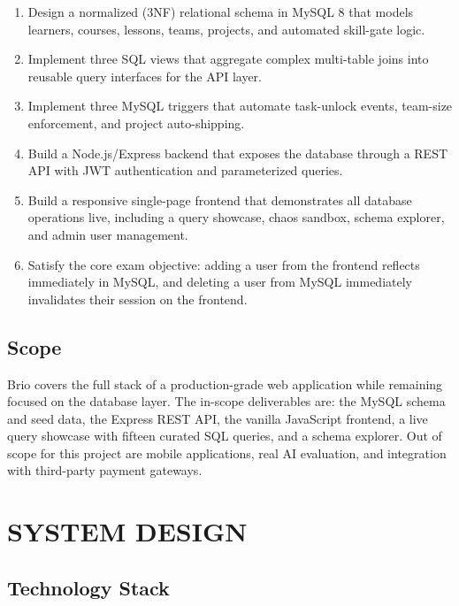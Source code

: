 \documentclass[12pt,a4paper]{article}
\begin{document}
\begin{enumerate}[label=\arabic*., itemsep=4pt]
    \item Design a normalized (3NF) relational schema in MySQL 8 that models learners, courses,
          lessons, teams, projects, and automated skill-gate logic.
    \item Implement three SQL views that aggregate complex multi-table joins into reusable query
          interfaces for the API layer.
    \item Implement three MySQL triggers that automate task-unlock events, team-size enforcement,
          and project auto-shipping.
    \item Build a Node.js/Express backend that exposes the database through a REST API with JWT
          authentication and parameterized queries.
    \item Build a responsive single-page frontend that demonstrates all database operations live,
          including a query showcase, chaos sandbox, schema explorer, and admin user management.
    \item Satisfy the core exam objective: adding a user from the frontend reflects immediately
          in MySQL, and deleting a user from MySQL immediately invalidates their session on the
          frontend.
\end{enumerate}

\subsection{Scope}

Brio covers the full stack of a production-grade web application while remaining focused on the
database layer. The in-scope deliverables are: the MySQL schema and seed data, the Express REST
API, the vanilla JavaScript frontend, a live query showcase with fifteen curated SQL queries,
and a schema explorer. Out of scope for this project are mobile applications, real AI evaluation,
and integration with third-party payment gateways.

\section{SYSTEM DESIGN}

\subsection{Technology Stack}
\end{document}
